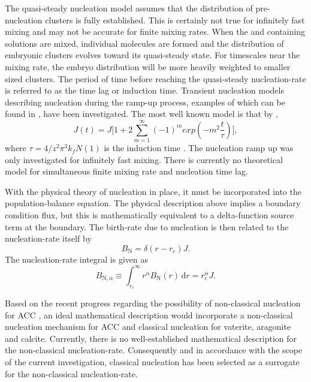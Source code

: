 \documentclass[preprint,3p,a4paper,times,12pt,authoryear]{elsarticle}
\begin{document}
The quasi-steady nucleation model assumes that the distribution of pre-nucleation clusters is fully established. This is certainly not true for infinitely fast mixing and may not be accurate for finite mixing rates. When the  and  containing solutions are mixed, individual  molecules are formed and the distribution of embryonic clusters evolves toward its quasi-steady state. For timescales near the mixing rate, the embryo distribution will be more heavily weighted to smaller sized clusters. The period of time before reaching the quasi-steady nucleation-rate is referred to as the time lag or induction time. Transient nucleation models describing nucleation during the ramp-up process,  examples of which can be found in \cite{Kelton2010}, have been investigated.  The most well known model is that by \citet{Kashchiev1969},
\begin{equation}
J(t) = J \bigg[1+ 2 \sum_{m=1}^\infty (-1)^m exp(-m^2 \frac{t}{\tau})\bigg],
\end{equation}
where $\tau = 4/z^2 \pi^3 k_f N(1)$ is the induction time \citep{Kelton1983}.  The nucleation ramp up was only investigated for infinitely fast mixing. There is currently no theoretical model for simultaneous finite mixing rate and nucleation time lag.

With the physical theory of nucleation in place, it must be incorporated into the population-balance equation. The physical description above implies a boundary condition flux, but this is mathematically equivalent to a  delta-function source term at the boundary.  The birth-rate due to nucleation is then related to the nucleation-rate itself by
\begin{equation}
B_{\text{N}} = \delta(r-r_{\text{c}}) J .
\end{equation}
The nucleation-rate integral is given as
\begin{equation}
B_{\text{N},\alpha} \equiv \int_{r_{\text{c}}}^\infty r^\alpha B_{\text{N}}(r) \, \mathrm{d}r = r_{\text{c}}^\alpha J .
\end{equation}

Based on the recent progress regarding the possibility of non-classical nucleation for ACC \citep{Gebauer2008,Rodriguez-Blanco2011}, an ideal mathematical description would incorporate a non-classical nucleation mechanism for ACC and classical nucleation for vaterite, aragonite and calcite. Currently, there is no well-established mathematical description for the non-classical nucleation-rate. Consequently and in accordance with the scope of the current investigation, classical nucleation has been selected as a surrogate for the non-classical nucleation-rate.
\end{document}
